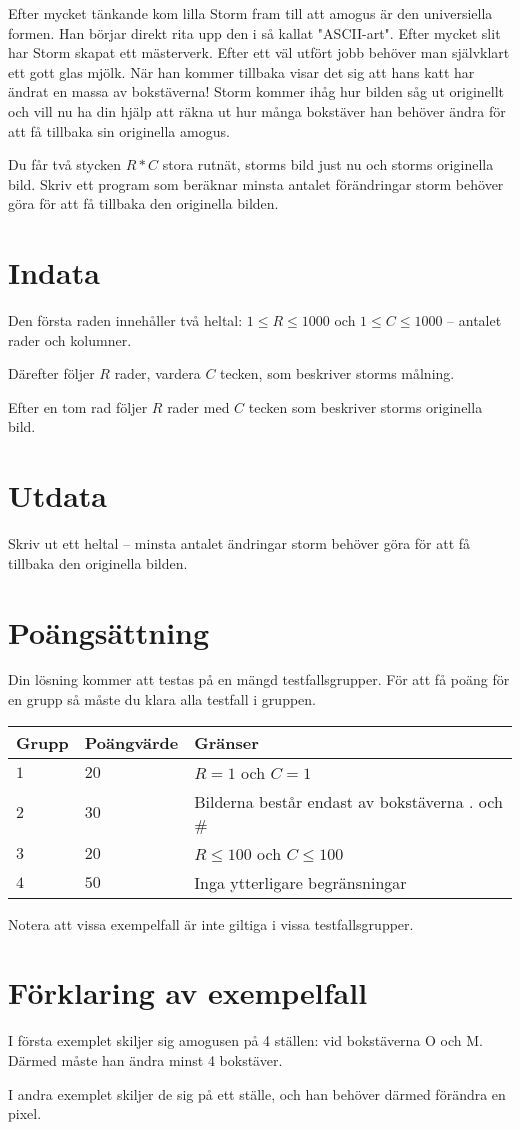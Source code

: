 ﻿
Efter mycket tänkande kom lilla Storm fram till att amogus är den universiella formen. Han börjar direkt rita upp den
i så kallat "ASCII-art". Efter mycket slit har Storm skapat ett mästerverk. Efter ett väl utfört jobb behöver man
självklart ett gott glas mjölk. När han kommer tillbaka visar det sig att hans katt har ändrat en massa av bokstäverna!
Storm kommer ihåg hur bilden såg ut originellt och vill nu ha din hjälp att räkna ut hur många bokstäver han behöver ändra
för att få tillbaka sin originella amogus.

Du får två stycken $R*C$ stora rutnät, storms bild just nu och storms originella bild. Skriv ett program som beräknar
minsta antalet förändringar storm behöver göra för att få tillbaka den originella bilden.

\section*{Indata}
Den första raden innehåller två heltal: $1\leq R \leq 1000$ och $1 \leq C \leq 1000$ -- antalet rader och kolumner.

Därefter följer $R$ rader, vardera $C$ tecken, som beskriver storms målning. 

Efter en tom rad följer $R$ rader med $C$ tecken som beskriver storms originella bild. 


\section*{Utdata}
Skriv ut ett heltal -- minsta antalet ändringar storm behöver göra för att få tillbaka den originella bilden.

\section*{Poängsättning}
Din lösning kommer att testas på en mängd testfallsgrupper.
För att få poäng för en grupp så måste du klara alla testfall i gruppen.

\noindent
\begin{tabular}{| l | l | p{12cm} |}
  \hline
  Grupp & Poängvärde & Gränser \\ \hline
  $1$   & $20$       & $R=1$ och $C=1$ \\ \hline
  $2$   & $30$       & Bilderna består endast av bokstäverna . och #\\ \hline
  $3$   & $20$       & $R \leq 100$ och $C \leq 100$  \\ \hline
  $4$   & $50$       & Inga ytterligare begränsningar  \\ \hline
\end{tabular}

Notera att vissa exempelfall är inte giltiga i vissa testfallsgrupper.


\section*{Förklaring av exempelfall}
I första exemplet skiljer sig amogusen på 4 ställen: vid bokstäverna O och M. Därmed måste han ändra minst 4 bokstäver.

I andra exemplet skiljer de sig på ett ställe, och han behöver därmed förändra en pixel.